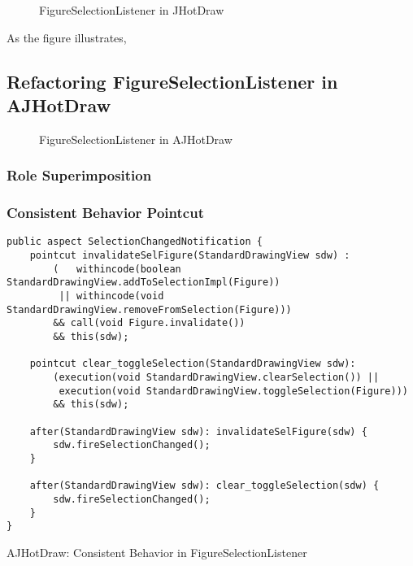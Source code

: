 \begin{figure}[H]
	\centering
  	\caption{FigureSelectionListener in JHotDraw}
  	\label{fig:JHotDraw_FigureSelectionListener_OOP}
\end{figure}

As the figure illustrates, 

\subsection{Refactoring FigureSelectionListener in AJHotDraw}

\begin{figure}[H]
	\centering
  	\caption{FigureSelectionListener in AJHotDraw}
  	\label{fig:JHotDraw_FigureSelectionListener_AOP}
\end{figure}

\subsubsection{Role Superimposition}

\subsubsection{Consistent Behavior Pointcut}
\begin{sourcecode} [H]
	\begin{lstlisting}[language=AspectJ, escapechar=|]
public aspect SelectionChangedNotification {
	pointcut invalidateSelFigure(StandardDrawingView sdw) :
		(   withincode(boolean StandardDrawingView.addToSelectionImpl(Figure)) 
		 || withincode(void StandardDrawingView.removeFromSelection(Figure)))
		&& call(void Figure.invalidate()) 
		&& this(sdw);

	pointcut clear_toggleSelection(StandardDrawingView sdw):
		(execution(void StandardDrawingView.clearSelection()) ||
		 execution(void StandardDrawingView.toggleSelection(Figure)))
		&& this(sdw);

	after(StandardDrawingView sdw): invalidateSelFigure(sdw) {
		sdw.fireSelectionChanged();
	}

	after(StandardDrawingView sdw): clear_toggleSelection(sdw) {
		sdw.fireSelectionChanged();
	}
}
	\end{lstlisting}
	\caption{AJHotDraw: Consistent Behavior in FigureSelectionListener}
	\label{lst:Consistent Behavior in FigureSelectionListener}
\end{sourcecode}

